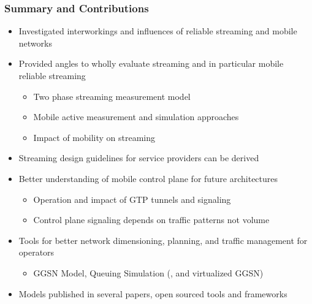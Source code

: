 \documentclass{beamer}
\begin{document}
\begin{frame}
	\frametitle{Summary and Contributions}

	\begin{itemize}
		\item Investigated interworkings and influences of reliable streaming and mobile networks
		\item Provided angles to wholly evaluate streaming and in particular mobile reliable streaming
		\begin{itemize}
			\item Two phase streaming measurement model
			\item Mobile active measurement and simulation approaches
			\item Impact of mobility on streaming
		\end{itemize}
		\item Streaming design guidelines for service providers can be derived
		\vspace{1em}
		\item Better understanding of mobile control plane for future architectures
			\begin{itemize}
				\item Operation and impact of GTP tunnels and signaling
				\item Control plane signaling depends on traffic patterns not volume
			\end{itemize}
		\item Tools for better network dimensioning, planning, and traffic management for operators
			\begin{itemize}
				\item GGSN Model, Queuing Simulation (, and virtualized GGSN)
			\end{itemize}
		\item Models published in several papers, open sourced tools and frameworks
	\end{itemize}
\end{frame}




\end{document}
